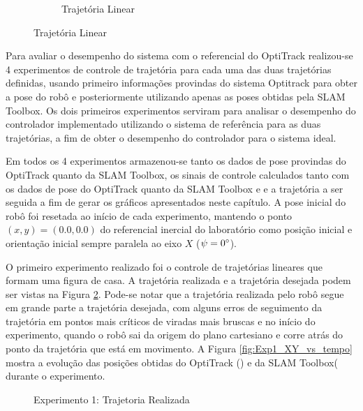 \begin{figure}
\begin{subfigure}[b]{0.4\textwidth}
        \caption{Trajetória Linear}
    \end{subfigure}
    \label{fig:exp_trajetorias}
    \sourceParbox[0.8\linewidth]
\end{figure}

Para avaliar o desempenho do sistema com o referencial do OptiTrack realizou-se 4 experimentos de controle de trajetória para cada uma das duas trajetórias definidas, usando primeiro informações provindas do sistema Optitrack para obter a pose do robô e posteriormente utilizando apenas as poses obtidas pela SLAM Toolbox. Os dois primeiros experimentos serviram para analisar o desempenho do controlador implementado utilizando o sistema de referência para as duas trajetórias, a fim de obter o desempenho do controlador para o sistema ideal.

Em todos os 4 experimentos armazenou-se tanto os dados de pose provindas do OptiTrack quanto da SLAM Toolbox, os sinais de controle calculados tanto com os dados de pose do OptiTrack quanto da SLAM Toolbox e e a trajetória a ser seguida a fim de gerar os gráficos apresentados neste capítulo. A pose inicial do robô foi resetada ao início de cada experimento, mantendo o ponto $(x,y)=(0.0 ,0.0)$ do referencial inercial do laboratório como posição inicial e orientação inicial sempre paralela ao eixo $X$ ($\psi = 0\degree$).

O primeiro experimento realizado foi o controle de trajetórias lineares que formam uma figura de casa. A trajetória realizada e a trajetória desejada podem ser vistas na Figura \ref{fig:Exp1_Trajetoria_VRPN_LINEAR}. Pode-se notar que a trajetória realizada pelo robô segue em grande parte a trajetória desejada, com alguns erros de seguimento da trajetória em pontos mais críticos de viradas mais bruscas e no início do experimento, quando o robô sai da origem do plano cartesiano e corre atrás do ponto da trajetória que está em movimento. A Figura \ref{fig:Exp1_XY_vs_tempo} mostra a evolução das posições obtidas do OptiTrack () e da SLAM Toolbox( durante o experimento.

\begin{figure}[htb]
    \centering
    \caption{Experimento 1: Trajetoria Realizada}
    \resizebox{0.9\linewidth}{!}{
    
    }
    \label{fig:Exp1_Trajetoria_VRPN_LINEAR}
    \source
\end{figure}


